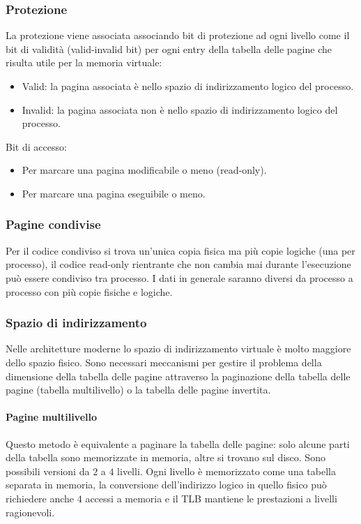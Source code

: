 \subsubsection{Protezione}
La protezione viene associata associando bit di protezione ad ogni livello come il bit di validit\`a (valid-invalid bit) per ogni entry della tabella delle pagine che risulta utile per
la memoria virtuale:
\begin{itemize}
	\item Valid: la pagina associata \`e nello spazio di indirizzamento logico del processo.
	\item Invalid: la pagina associata non \`e nello spazio di indirizzamento logico del processo.
\end{itemize}
Bit di accesso:
\begin{itemize}
	\item Per marcare una pagina modificabile o meno (read-only).
	\item Per marcare una pagina eseguibile o meno. 
\end{itemize}
\subsubsection{Pagine condivise}
Per il codice condiviso si trova un'unica copia fisica ma pi\`u copie logiche (una per processo), il codice read-only rientrante che non cambia mai durante l'esecuzione pu\`o essere
condiviso tra processo. I dati in generale saranno diversi da processo a processo con pi\`u copie fisiche e logiche. 
\subsubsection{Spazio di indirizzamento}
Nelle architetture moderne lo spazio di indirizzamento virtuale \`e molto maggiore dello spazio fisico. Sono necessari meccanismi per gestire il problema della dimensione della
tabella delle pagine attraverso la paginazione della tabella delle pagine (tabella multilivello) o la tabella delle pagine invertita. 
\paragraph{Pagine multilivello}
Questo metodo \`e equivalente a paginare la tabella delle pagine: solo alcune parti della tabella sono memorizzate in memoria, altre si trovano sul disco. Sono possibili versioni da
$2$ a $4$ livelli. Ogni livello \`e memorizzato come una tabella separata in memoria, la conversione dell'indirizzo logico in quello fisico pu\`o richiedere anche $4$ accessi a memoria
e il TLB mantiene le prestazioni a livelli ragionevoli. 
